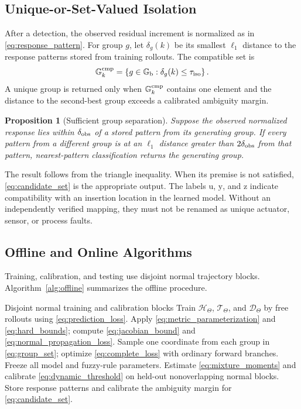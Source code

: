 \documentclass[journal]{IEEEtran}
\newtheorem{proposition}{Proposition}
\newcommand{\1}{\bm 1}
\begin{document}
\subsection{Unique-or-Set-Valued Isolation}
After a detection, the observed residual increment is normalized as in
\eqref{eq:response_pattern}. For group $g$, let $\delta_g(k)$ be its smallest
$\ell_1$ distance to the response patterns stored from training rollouts. The
compatible set is
\begin{equation}
\mathbb G_k^{\rm cmp}=
\left\{g\in\mathbb G_{\rm b}:
\delta_g(k)\leq\tau_{\rm iso}\right\}.
\label{eq:candidate_set}
\end{equation}
A unique group is returned only when
$\mathbb G_k^{\rm cmp}$ contains one element and the distance to the
second-best group exceeds a calibrated ambiguity margin.

\begin{proposition}[Sufficient group separation]
\label{prop:isolation}
Suppose the observed normalized response lies within $\delta_{\rm obs}$ of a
stored pattern from its generating group. If every pattern from a different
group is at an $\ell_1$ distance greater than $2\delta_{\rm obs}$ from that
pattern, nearest-pattern classification returns the generating group.
\end{proposition}

The result follows from the triangle inequality. When its premise is not
satisfied, \eqref{eq:candidate_set} is the appropriate output. The labels
$\mathrm u$, $\mathrm y$, and $\mathrm z$ indicate compatibility with an
insertion location in the learned model. Without an independently verified
mapping, they must not be renamed as unique actuator, sensor, or process
faults.

\subsection{Offline and Online Algorithms}
Training, calibration, and testing use disjoint normal trajectory blocks.
Algorithm~\ref{alg:offline} summarizes the offline procedure.

\begin{algorithm}[H]
\caption{Normal-Data Offline Design}
\label{alg:offline}
\begin{algorithmic}[1]
\Require Disjoint normal training and calibration blocks
\State Train $\mathcal H_\Theta$, $\mathcal T_\Theta$, and
$\mathcal D_\Theta$ by free rollouts using \eqref{eq:prediction_loss}.
\State Apply \eqref{eq:metric_parameterization} and \eqref{eq:hard_bounds};
compute \eqref{eq:jacobian_bound} and \eqref{eq:normal_propagation_loss}.
\State Sample one coordinate from each group in \eqref{eq:group_set};
optimize \eqref{eq:complete_loss} with ordinary forward branches.
\State Freeze all model and fuzzy-rule parameters.
\State Estimate \eqref{eq:mixture_moments} and calibrate
\eqref{eq:dynamic_threshold} on held-out nonoverlapping normal blocks.
\State Store response patterns and calibrate the ambiguity margin for
\eqref{eq:candidate_set}.
\end{algorithmic}
\end{algorithm}
\end{document}
